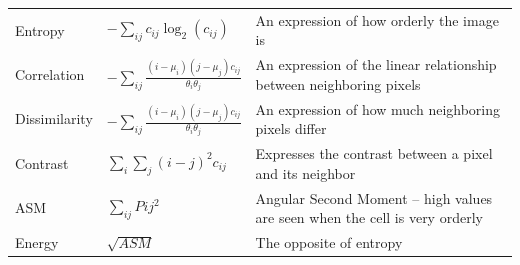 \documentclass[letterpaper]{article}
\begin{document}
{\begin{longtable}{x{\dimexpr.15\tabcolsep}
                  x{\dimexpr.225\tabcolsep}
                  x{\dimexpr.625\tabcolsep}}
		Entropy     
		& $-\sum_{ij}c_{ij}\log_{2}(c_{ij}) $                    
		& An expression of how orderly the image is
\tabularnewline\addlinespace

		Correlation      
		& \begin{minipage}[t]{0.3\textwidth}
			$-\sum_{ij}\frac{(i-\mu_{i})(j - \mu_{j}) c_{ij}}{\theta_{i}\theta_{j}}$ 
		   \end{minipage}
		& An expression of the linear relationship between neighboring pixels 
\tabularnewline\addlinespace

		Dissimilarity      
		& \begin{minipage}[t]{0.3\textwidth}
			$-\sum_{ij}\frac{(i-\mu_{i})(j - \mu_{j}) c_{ij}}{\theta_{i}\theta_{j}}$ 
		   \end{minipage}
		& An expression of how much neighboring pixels differ 
\tabularnewline\addlinespace

		Contrast      
		& $\sum_{i}\sum_{j}{(i - j)}^2 c_{ij}$ 
		& Expresses the contrast between a pixel and its neighbor
\tabularnewline\addlinespace

		ASM      
		& $\sum_{ij}P{ij}^2$
		& Angular Second Moment -- high values are seen when the cell is very orderly
\tabularnewline\addlinespace

		Energy   
		& $\sqrt{ASM}$ 
		& The opposite of entropy
\label{table:shape-formulae}
\end{longtable}
}
\end{document}
